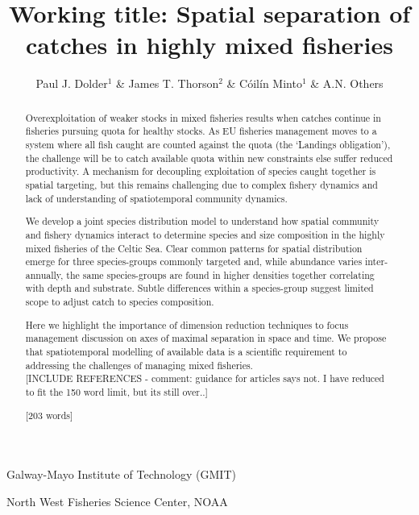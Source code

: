 \documentclass{nature}
\title{Working title: Spatial separation of catches in highly mixed fisheries}
\author{Paul J. Dolder$^1$ \& James T. Thorson$^2$ \& Cóilín Minto$^1$ \& A.N.
Others}
\begin{document}
\maketitle

\begin{affiliations}
\item Galway-Mayo Institute of Technology (GMIT) 
\item North West Fisheries Science Center, NOAA
\end{affiliations}

\begin{linenumbers}

\begin{abstract} 
Overexploitation of weaker stocks in mixed fisheries results when catches
continue in fisheries pursuing quota for healthy stocks. As EU fisheries
management moves to a system where all fish caught are counted against the
quota (the `Landings obligation'), the challenge will be to catch available
quota within new constraints else suffer reduced productivity.  A mechanism for
decoupling exploitation of species caught together is spatial targeting, but
this remains challenging due to complex fishery dynamics and lack of
understanding of spatiotemporal community dynamics.  

We develop a joint species distribution model to understand how spatial
community and fishery dynamics interact to determine species and size
composition in the highly mixed fisheries of the Celtic Sea. Clear common
patterns for spatial distribution emerge for three species-groups commonly
targeted and, while abundance varies inter-annually, the same species-groups
are found in higher densities together correlating with depth and substrate.
Subtle differences within a species-group suggest limited scope to adjust catch
to species composition. 

Here we highlight the importance of dimension reduction techniques to focus
management discussion on axes of maximal separation in space and time. We
propose that spatiotemporal modelling of available data is a scientific
requirement to addressing the challenges of managing mixed fisheries. \\ 

[INCLUDE REFERENCES - comment: guidance for articles says not. I have reduced
to fit the 150 word limit, but its still over..]

[203 words]

\end{abstract}


\end{linenumbers}
\end{document}
